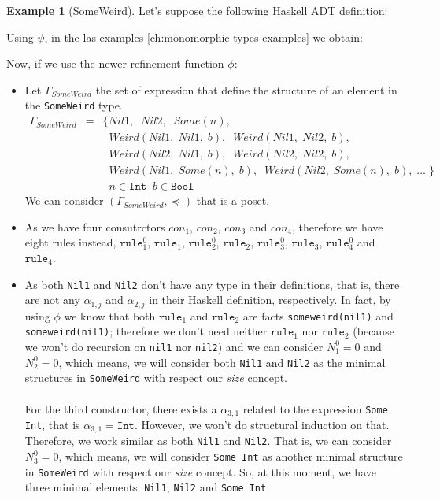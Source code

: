 \documentclass{report}
\theoremstyle{definition}
\newtheorem{example}{Example}[section]
\theoremstyle{definition}
\newcommand{\ttt}[1]{\texttt{#1}}
\newcommand{\tav}{\;\;}
\begin{document}
\begin{example}[SomeWeird]
	Let's suppose the following Haskell ADT definition:
	
	Using $\psi$, in the las examples \ref{ch:monomorphic-types-examples} we obtain:

Now, if we use the newer refinement function $\phi$:
\begin{itemize}
	\item Let $\Gamma_{SomeWeird}$ the set of expression that define the structure of an element in the \ttt{SomeWeird} type.
	\begin{eqnarray*}
		\Gamma_{SomeWeird} & = & \{ Nil1, \tav Nil2, \tav Some(n), \\
						&& \tav Weird(Nil1, \; Nil1, \; b), \tav Weird(Nil1, \; Nil2, \; b), \\
						&& \tav Weird(Nil2, \; Nil1, \; b), \tav Weird(Nil2, \; Nil2, \; b),  \\
						&& \tav Weird(Nil1, \; Some(n), \; b), \tav Weird(Nil2, \; Some(n), \; b), \; \ldots \; \} \\
						&& \tav n \in \ttt{Int} \tav b \in \ttt{Bool}
	\end{eqnarray*}
	We can consider $(\Gamma_{SomeWeird}, \preceq)$ that is a poset.
	\item As we have four consutrctors $con_1$, $con_2$, $con_3$ and $con_4$, therefore we have eight rules instead, $\ttt{rule}_{1}^{0}$, $\ttt{rule}_1$, $\ttt{rule}_{2}^{0}$, $\ttt{rule}_2$, $\ttt{rule}_{3}^{0}$, $\ttt{rule}_3$, $\ttt{rule}_{4}^{0}$ and $\ttt{rule}_4$.
	\item As both \ttt{Nil1} and \ttt{Nil2} don't have any type in their definitions, that is, there are not any $\alpha_{1,j}$ and $\alpha_{2,j}$ in their Haskell definition, respectively. In fact, by using $\phi$ we know that both $\ttt{rule}_1$ and $\ttt{rule}_2$ are facts \ttt{someweird(nil1)} and \ttt{someweird(nil1)}; therefore we don't need neither $\ttt{rule}_1$ nor $\ttt{rule}_2$ (because we won't do recursion on \ttt{nil1} nor \ttt{nil2}) and we can consider $N_{1}^{0} = 0$ and $N_{2}^{0} = 0$, which means, we will consider both \ttt{Nil1} and \ttt{Nil2} as the minimal structures in \ttt{SomeWeird} with respect our \textit{size} concept.\\\\
	For the third constructor, there exists a $\alpha_{3,1}$  related to the expression \ttt{Some Int}, that is $\alpha_{3,1} = \ttt{Int}$. However, we won't do structural induction on that. Therefore, we work similar as both \ttt{Nil1} and \ttt{Nil2}. That is, we can consider $N_{3}^{0} = 0$, which means, we will consider \ttt{Some Int} as another minimal structure in \ttt{SomeWeird} with respect our \textit{size} concept. So, at this moment, we have three minimal elements: \ttt{Nil1}, \ttt{Nil2} and \ttt{Some Int}.\\\\

\end{itemize}
\end{example}
\end{document}
